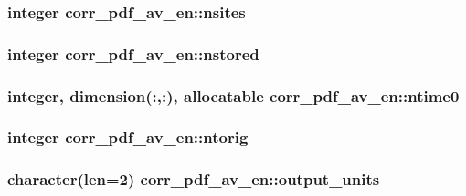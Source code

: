 \hypertarget{classcorr__pdf__av__en_a7f5343d880e5cc9e13e270c324fb139e}{
\subsubsection[{nsites}]{\setlength{\rightskip}{0pt plus 5cm}integer corr\+\_\+pdf\+\_\+av\+\_\+en\+::nsites}}\label{classcorr__pdf__av__en_a7f5343d880e5cc9e13e270c324fb139e}
\hypertarget{classcorr__pdf__av__en_acf731df4af6c01560652a65159e0f7f7}{
\subsubsection[{nstored}]{\setlength{\rightskip}{0pt plus 5cm}integer corr\+\_\+pdf\+\_\+av\+\_\+en\+::nstored}}\label{classcorr__pdf__av__en_acf731df4af6c01560652a65159e0f7f7}
\hypertarget{classcorr__pdf__av__en_a56baf9925a93ff5a4baf60def769733d}{
\subsubsection[{ntime0}]{\setlength{\rightskip}{0pt plus 5cm}integer, dimension(\+:,\+:), allocatable corr\+\_\+pdf\+\_\+av\+\_\+en\+::ntime0}}\label{classcorr__pdf__av__en_a56baf9925a93ff5a4baf60def769733d}
\hypertarget{classcorr__pdf__av__en_ae8807b4964dcdef98e16911d1d3a2ca0}{
\subsubsection[{ntorig}]{\setlength{\rightskip}{0pt plus 5cm}integer corr\+\_\+pdf\+\_\+av\+\_\+en\+::ntorig}}\label{classcorr__pdf__av__en_ae8807b4964dcdef98e16911d1d3a2ca0}
\hypertarget{classcorr__pdf__av__en_aefae69a49caaea37801a27e457746d69}{
\subsubsection[{output\+\_\+units}]{\setlength{\rightskip}{0pt plus 5cm}character(len=2) corr\+\_\+pdf\+\_\+av\+\_\+en\+::output\+\_\+units}}\label{classcorr__pdf__av__en_aefae69a49caaea37801a27e457746d69}
